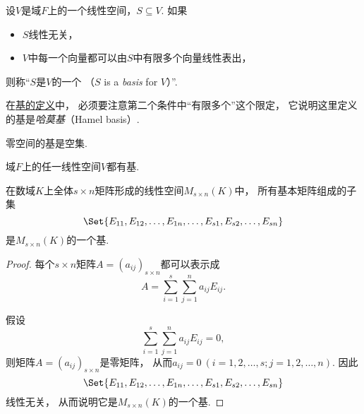 \begin{definition}\label{definition:线性空间.线性空间的基}
设\(V\)是域\(F\)上的一个线性空间，\(S \subseteq V\).
如果\begin{itemize}
	\item \(S\)线性无关，
	\item \(V\)中每一个向量都可以由\(S\)中有限多个向量线性表出，
\end{itemize}
则称“\(S\)是\(V\)的一个%
（\(S\) is a \emph{basis} for \(V\)）”.
\end{definition}
\begin{remark}
在\hyperref[definition:线性空间.线性空间的基]{基的定义}中，
必须要注意第二个条件中“有限多个”这个限定，
它说明这里定义的基是\emph{哈莫基}（Hamel basis）.
\end{remark}

\begin{property}\label{theorem:线性空间的结构.零空间的基是空集}
零空间的基是空集.
\end{property}

\begin{property}
域\(F\)上的任一线性空间\(V\)都有基.
\end{property}

\begin{example}
在数域\(K\)上全体\(s \times n\)矩阵形成的线性空间\(M_{s \times n}(K)\)中，
所有基本矩阵组成的子集\[
	\Set{
		E_{11},E_{12},\dotsc,E_{1n},
		\dotsc,
		E_{s1},E_{s2},\dotsc,E_{sn}
	}
\]是\(M_{s \times n}(K)\)的一个基.
\begin{proof}
每个\(s \times n\)矩阵\(A = (a_{ij})_{s \times n}\)都可以表示成\[
	A = \sum_{i=1}^s \sum_{j=1}^n a_{ij} E_{ij}.
\]

假设\[
	\sum_{i=1}^s \sum_{j=1}^n a_{ij} E_{ij} = 0,
\]
则矩阵\(A = (a_{ij})_{s \times n}\)是零矩阵，
从而\(a_{ij} = 0\ (i=1,2,\dotsc,s;j=1,2,\dotsc,n)\).
因此\[
	\Set{
		E_{11},E_{12},\dotsc,E_{1n},
		\dotsc,
		E_{s1},E_{s2},\dotsc,E_{sn}
	}
\]线性无关，
从而说明它是\(M_{s \times n}(K)\)的一个基.
\end{proof}
\end{example}

